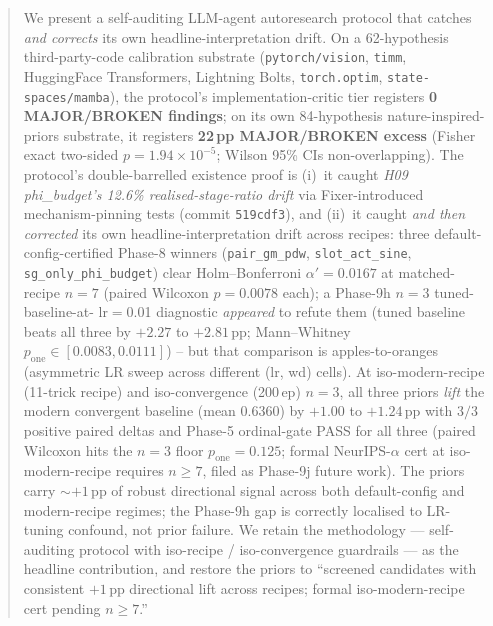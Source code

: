 
\begin{abstract}
We present a self-auditing LLM-agent autoresearch protocol that catches
\emph{and corrects} its own headline-interpretation drift. On a
62-hypothesis third-party-code calibration substrate
(\texttt{pytorch/vision}, \texttt{timm}, HuggingFace Transformers,
Lightning Bolts, \texttt{torch.optim}, \texttt{state-spaces/mamba}),
the protocol's implementation-critic tier registers \textbf{0
MAJOR/BROKEN findings}; on its own 84-hypothesis
nature-inspired-priors substrate, it registers \textbf{22\,pp
MAJOR/BROKEN excess} (Fisher exact two-sided $p = 1.94 \times 10^{-5}$;
Wilson 95\% CIs non-overlapping). The protocol's double-barrelled
existence proof is (i)~it caught \emph{H09 phi\_budget's 12.6\%
realised-stage-ratio drift} via Fixer-introduced mechanism-pinning
tests (commit \texttt{519cdf3}), and (ii)~it caught \emph{and then
corrected} its own headline-interpretation drift across recipes: three
default-config-certified Phase-8 winners (\texttt{pair\_gm\_pdw},
\texttt{slot\_act\_sine}, \texttt{sg\_only\_phi\_budget}) clear
Holm--Bonferroni $\alpha'{=}0.0167$ at matched-recipe $n{=}7$ (paired
Wilcoxon $p{=}0.0078$ each); a Phase-9h $n{=}3$ tuned-baseline-at-
lr$=$0.01 diagnostic \emph{appeared} to refute them (tuned baseline
beats all three by $+2.27$ to $+2.81$\,pp; Mann--Whitney
$p_{\mathrm{one}} \in [0.0083, 0.0111]$) -- but that comparison is
apples-to-oranges (asymmetric LR sweep across different (lr, wd)
cells). At iso-modern-recipe (11-trick recipe) and iso-convergence
(200\,ep) $n{=}3$, all three priors \emph{lift} the modern convergent
baseline (mean $0.6360$) by $+1.00$ to $+1.24$\,pp with $3/3$ positive
paired deltas and Phase-5 ordinal-gate PASS for all three (paired
Wilcoxon hits the $n{=}3$ floor $p_{\mathrm{one}}{=}0.125$; formal
NeurIPS-$\alpha$ cert at iso-modern-recipe requires $n{\geq}7$, filed
as Phase-9j future work). The priors carry $\sim{+1}$\,pp of robust
directional signal across both default-config and modern-recipe
regimes; the Phase-9h gap is correctly localised to LR-tuning
confound, not prior failure. We retain the methodology --- self-
auditing protocol with iso-recipe / iso-convergence guardrails --- as
the headline contribution, and restore the priors to ``screened
candidates with consistent $+1$\,pp directional lift across recipes;
formal iso-modern-recipe cert pending $n{\geq}7$.''
\end{abstract}
